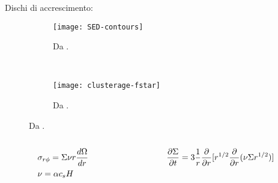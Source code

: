 \begin{frame}{Dischi di accrescimento: }
\begin{figure}[!ht]
	\begin{subfigure}[b]{0.39\textwidth}
		\centering
		\texttt{[image: SED-contours]}
		\caption{Da \cite{andrews2010protoplanetary}.}\label{fig:SED-contours}
	\end{subfigure}
	~
	\begin{subfigure}[b]{0.55\textwidth}
		\centering
		\texttt{[image: clusterage-fstar]}
		\caption{Da \cite{mamajek2009initial}. }\label{fig:clusterage-fstar}
	\end{subfigure}
\end{figure}
\begin{columns}[T]
\begin{column}{0.5\textwidth}
\begin{align*}
&\sigma_{r\phi}=\Sigma\nu r \frac{d \Omega}{d r}\\
&\nu=\alpha c_sH
\end{align*}
\end{column}
\begin{column}{0.5\textwidth}
\begin{equation*}
\frac{\partial \Sigma}{\partial t}=3\frac{1}{r}\frac{\partial}{\partial r}[r^{1/2}\frac{\partial}{\partial r}(\nu\Sigma r^{1/2})]\label{eq:sigmaevol}
\end{equation*}
\end{column}
\end{columns}
\end{frame}

